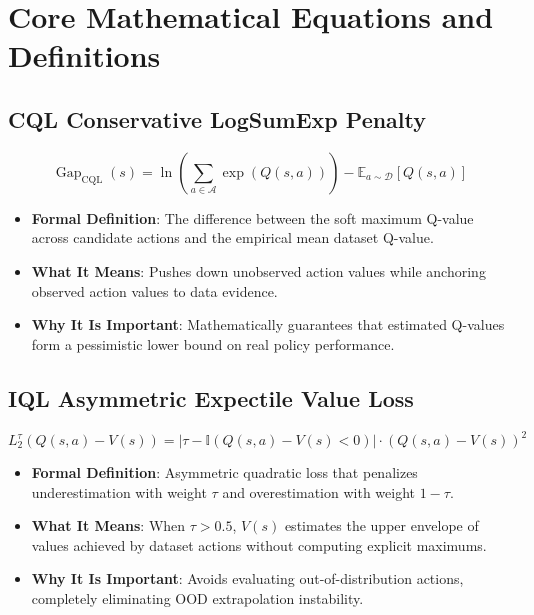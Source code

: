 \documentclass[11pt,a4paper]{article}
\theoremstyle{definition}
\begin{document}
\section{Core Mathematical Equations and Definitions}

\subsection{CQL Conservative LogSumExp Penalty}
{\boldmath
\begin{equation}
\operatorname{Gap}_{\text{CQL}}(s) = \ln \left( \sum_{a \in \mathcal{A}} \exp(Q(s, a)) \right) - \mathbb{E}_{a \sim \mathcal{D}}[Q(s, a)]
\end{equation}
}
\begin{itemize}
    \item \textbf{Formal Definition}: The difference between the soft maximum Q-value across candidate actions and the empirical mean dataset Q-value.
    \item \textbf{What It Means}: Pushes down unobserved action values while anchoring observed action values to data evidence.
    \item \textbf{Why It Is Important}: Mathematically guarantees that estimated Q-values form a pessimistic lower bound on real policy performance.
\end{itemize}

\subsection{IQL Asymmetric Expectile Value Loss}
{\boldmath
\begin{equation}
L_2^\tau(Q(s, a) - V(s)) = |\tau - \mathbb{I}(Q(s, a) - V(s) < 0)| \cdot (Q(s, a) - V(s))^2
\end{equation}
}
\begin{itemize}
    \item \textbf{Formal Definition}: Asymmetric quadratic loss that penalizes underestimation with weight $\tau$ and overestimation with weight $1 - \tau$.
    \item \textbf{What It Means}: When $\tau > 0.5$, $V(s)$ estimates the upper envelope of values achieved by dataset actions without computing explicit maximums.
    \item \textbf{Why It Is Important}: Avoids evaluating out-of-distribution actions, completely eliminating OOD extrapolation instability.
\end{itemize}
\end{document}
